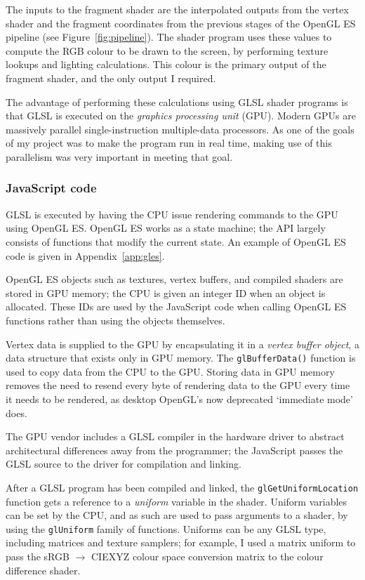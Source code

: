 \documentclass[12pt,twoside,notitlepage]{report}
\begin{document}
The inputs to the fragment shader are the interpolated outputs from the vertex shader and the fragment coordinates from the previous stages of the OpenGL ES pipeline (see Figure~\ref{fig:pipeline}). The shader program uses these values to compute the RGB colour to be drawn to the screen, by performing texture lookups and lighting calculations. This colour is the primary output of the fragment shader, and the only output I required.

The advantage of performing these calculations using GLSL shader programs is that GLSL is executed on the \textit{graphics processing unit} (GPU). Modern GPUs are massively parallel single-instruction multiple-data processors. As one of the goals of my project was to make the program run in real time, making use of this parallelism was very important in meeting that goal.

\subsubsection{JavaScript code}

GLSL is executed by having the CPU issue rendering commands to the GPU using OpenGL ES. OpenGL ES works as a state machine; the API largely consists of functions that modify the current state. An example of OpenGL ES code is given in Appendix~\ref{app:gles}.

OpenGL ES objects such as textures, vertex buffers, and compiled shaders are stored in GPU memory; the CPU is given an integer ID when an object is allocated. These IDs are used by the JavaScript code when calling OpenGL ES functions rather than using the objects themselves.

Vertex data is supplied to the GPU by encapsulating it in a \textit{vertex buffer object}, a data structure that exists only in GPU memory. The \verb|glBufferData()| function is used to copy data from the CPU to the GPU. Storing data in GPU memory removes the need to resend every byte of rendering data to the GPU every time it needs to be rendered, as desktop OpenGL's now deprecated `immediate mode' does.

The GPU vendor includes a GLSL compiler in the hardware driver to abstract architectural differences away from the programmer; the JavaScript passes the GLSL source to the driver for compilation and linking.

After a GLSL program has been compiled and linked, the \verb|glGetUniformLocation| function gets a reference to a \textit{uniform} variable in the shader. Uniform variables can be set by the CPU, and as such are used to pass arguments to a shader, by using the \verb|glUniform| family of functions. Uniforms can be any GLSL type, including matrices and texture samplers; for example, I used a matrix uniform to pass the sRGB $\rightarrow$ CIEXYZ colour space conversion matrix to the colour difference shader.
\end{document}
